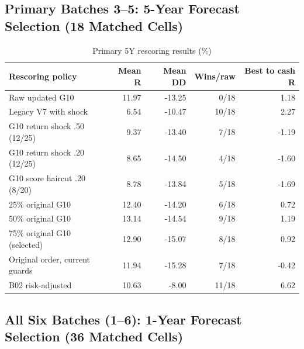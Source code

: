 \documentclass[11pt,a4paper]{article}
\numberwithin{table}{section}
\begin{document}
\subsection{Primary Batches 3--5: 5-Year Forecast Selection (18 Matched Cells)}

\begin{minipage}{\linewidth}
\begin{center}\small\setlength{\tabcolsep}{3pt}\renewcommand{\arraystretch}{1.18}
\begin{longtable}{@{}p{.43\linewidth}rrrr@{}}
\caption{Primary 5Y rescoring results (\%)}\\
\toprule
Rescoring policy & Mean R & Mean DD & Wins/raw & Best to cash R\\\midrule\endhead
Raw updated G10 & 11.97 & -13.25 & 0/18 & 1.18\\
Legacy V7 with shock & 6.54 & -10.47 & 10/18 & 2.27\\
G10 return shock .50 (12/25) & 9.37 & -13.40 & 7/18 & -1.19\\
G10 return shock .20 (12/25) & 8.65 & -14.50 & 4/18 & -1.60\\
G10 score haircut .20 (8/20) & 8.78 & -13.84 & 5/18 & -1.69\\
25\% original G10 & 12.40 & -14.20 & 6/18 & 0.72\\
50\% original G10 & 13.14 & -14.54 & 9/18 & 1.19\\
75\% original G10 (selected) & 12.90 & -15.07 & 8/18 & 0.92\\
Original order, current guards & 11.94 & -15.28 & 7/18 & -0.42\\
B02 risk-adjusted & 10.63 & -8.00 & 11/18 & 6.62\\
\bottomrule\end{longtable}\end{center}
\end{minipage}\par
\subsection{All Six Batches (1--6): 1-Year Forecast Selection (36 Matched Cells)}
\end{document}

